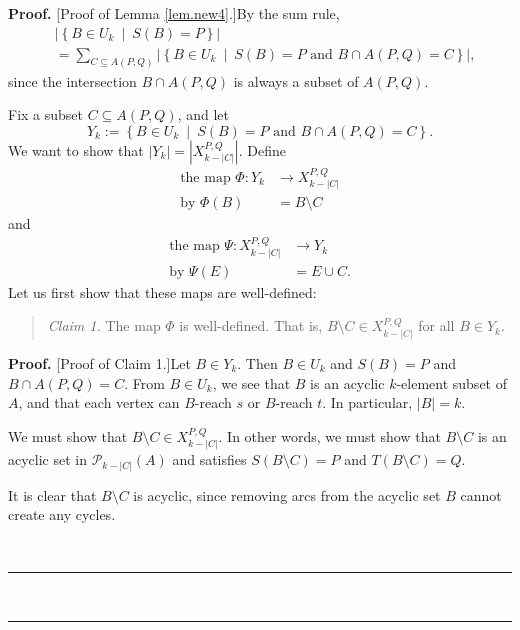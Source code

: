 \documentclass[numbers=enddot,12pt,final,onecolumn,notitlepage]{scrartcl}%
\theoremstyle{definition}
\newenvironment{statement}{\begin{quote}}{\end{quote}}
\newenvironment{proof}[1][Proof]{\noindent\textbf{#1.} }{\ \rule{0.5em}{0.5em}}
\let\sumnonlimits\sum
\renewcommand{\sum}{\sumnonlimits\limits}
\theoremstyle{plainsl}
\begin{document}
\begin{proof}
[Proof of Lemma \ref{lem.new4}.]By the sum rule,
\begin{align}
&  \left\vert \left\{  B\in U_{k}\ \mid\ S\left(  B\right)  =P\right\}
\right\vert \nonumber\\
&  =\sum_{C\subseteq A\left(  P,Q\right)  }\left\vert \left\{  B\in
U_{k}\ \mid\ S\left(  B\right)  =P\text{ and }B\cap A\left(  P,Q\right)
=C\right\}  \right\vert , \label{pf.lem.new4.sum}%
\end{align}
since the intersection $B\cap A\left(  P,Q\right)  $ is always a subset of
$A\left(  P,Q\right)  $.

Fix a subset $C\subseteq A(P,Q)$, and let
\[
Y_{k}:=\left\{  B\in U_{k}\ \mid\ S\left(  B\right)  =P\text{ and }B\cap
A\left(  P,Q\right)  =C\right\}  .
\]
We want to show that $\left\vert Y_{k}\right\vert =\left\vert X_{k-|C|}%
^{P,Q}\right\vert $. Define
\begin{align*}
\text{the map }\Phi:Y_{k}  &  \rightarrow X_{k-|C|}^{P,Q}\\
\text{by }\Phi(B)  &  =B\setminus C
\end{align*}
and
\begin{align*}
\text{the map }\Psi:X_{k-|C|}^{P,Q}  &  \rightarrow Y_{k}\\
\text{by }\Psi(E)  &  =E\cup C.
\end{align*}
Let us first show that these maps are well-defined:

\begin{statement}
\textit{Claim 1.} The map $\Phi$ is well-defined. That is, $B\setminus C\in
X_{k-|C|}^{P,Q}$ for all $B\in Y_{k}$.
\end{statement}

\begin{proof}
[Proof of Claim 1.]Let $B\in Y_{k}$. Then $B\in U_{k}$ and $S\left(  B\right)
=P$ and $B\cap A\left(  P,Q\right)  =C$. From $B\in U_{k}$, we see that $B$ is
an acyclic $k$-element subset of $A$, and that each vertex can $B$-reach $s$
or $B$-reach $t$. In particular, $\left\vert B\right\vert =k$.

We must show that $B\setminus C\in X_{k-|C|}^{P,Q}$. In other words, we must
show that $B\setminus C$ is an acyclic set in $\mathcal{P}_{k-\left\vert
C\right\vert }\left(  A\right)  $ and satisfies $S\left(  B\setminus C\right)
=P$ and $T\left(  B\setminus C\right)  =Q$.

It is clear that $B\setminus C$ is acyclic, since removing arcs from the
acyclic set $B$ cannot create any cycles.


\end{proof}
\end{proof}
\end{document}
